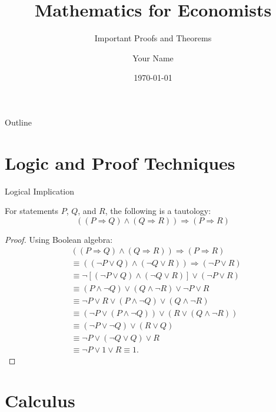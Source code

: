 \documentclass{beamer}
\title{Mathematics for Economists}
\subtitle{Important Proofs and Theorems}
\author{Your Name}
\institute{University Name}
\date{\today}
\begin{document}
\begin{frame}
    \titlepage
\end{frame}

\begin{frame}{Outline}
    \tableofcontents
\end{frame}

\section{Logic and Proof Techniques}

\begin{frame}{Logical Implication}
    \begin{theorem}
        For statements $P$, $Q$, and $R$, the following is a tautology:
        \[
        ((P \Rightarrow Q) \land (Q \Rightarrow R)) \Rightarrow (P \Rightarrow R)
        \]
    \end{theorem}

    \begin{proof}
        Using Boolean algebra:
        \begin{align*}
            &((P \Rightarrow Q) \land (Q \Rightarrow R)) \Rightarrow (P \Rightarrow R) \\
            &\equiv ((\neg P \lor Q) \land (\neg Q \lor R)) \Rightarrow (\neg P \lor R) \\
            &\equiv \neg[(\neg P \lor Q) \land (\neg Q \lor R)] \lor (\neg P \lor R) \\
            &\equiv (P \land \neg Q) \lor (Q \land \neg R) \lor \neg P \lor R \\
            &\equiv \neg P \lor R \lor (P \land \neg Q) \lor (Q \land \neg R) \\
            &\equiv (\neg P \lor (P \land \neg Q)) \lor (R \lor (Q \land \neg R)) \\
            &\equiv (\neg P \lor \neg Q) \lor (R \lor Q) \\
            &\equiv \neg P \lor (\neg Q \lor Q) \lor R \\
            &\equiv \neg P \lor 1 \lor R \equiv 1.
        \end{align*}
    \end{proof}
\end{frame}

\section{Calculus}
\end{document}
